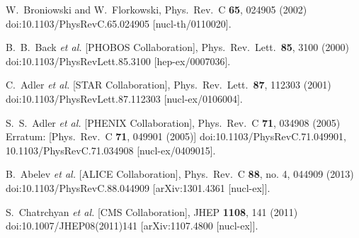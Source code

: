 \documentclass[aps,prc,twocolumn,superscriptaddress,showpacs,floatfix,nofootinbib]{revtex4-1}
\begin{document}
\begin{thebibliography}{99}
  W.~Broniowski and W.~Florkowski,
  Phys.\ Rev.\ C {\bf 65}, 024905 (2002)
  doi:10.1103/PhysRevC.65.024905
  [nucl-th/0110020].


  B.~B.~Back {\it et al.} [PHOBOS Collaboration],
  Phys.\ Rev.\ Lett.\  {\bf 85}, 3100 (2000)
  doi:10.1103/PhysRevLett.85.3100
  [hep-ex/0007036].


  C.~Adler {\it et al.} [STAR Collaboration],
  Phys.\ Rev.\ Lett.\  {\bf 87}, 112303 (2001)
  doi:10.1103/PhysRevLett.87.112303
  [nucl-ex/0106004].


  S.~S.~Adler {\it et al.} [PHENIX Collaboration],
  Phys.\ Rev.\ C {\bf 71}, 034908 (2005)
  Erratum: [Phys.\ Rev.\ C {\bf 71}, 049901 (2005)]
  doi:10.1103/PhysRevC.71.049901, 10.1103/PhysRevC.71.034908
  [nucl-ex/0409015].


  B.~Abelev {\it et al.} [ALICE Collaboration],
  Phys.\ Rev.\ C {\bf 88}, no. 4, 044909 (2013)
  doi:10.1103/PhysRevC.88.044909
  [arXiv:1301.4361 [nucl-ex]].


  S.~Chatrchyan {\it et al.} [CMS Collaboration],
  JHEP {\bf 1108}, 141 (2011)
  doi:10.1007/JHEP08(2011)141
  [arXiv:1107.4800 [nucl-ex]].



\end{thebibliography}
\end{document}
